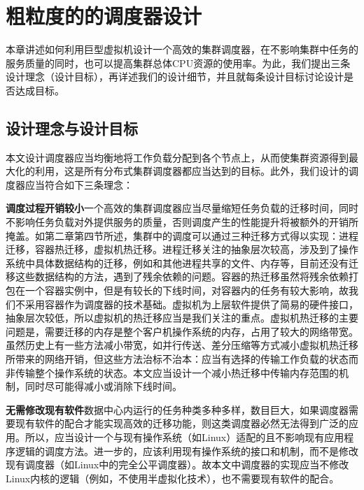 
\chapter{粗粒度的的调度器设计}
\label{chap:LB}
本章讲述如何利用巨型虚拟机设计一个高效的集群调度器，在不影响集群中任务的服务质量的同时，也可以提高集群总体CPU资源的使用率。为此，我们提出三条设计理念（设计目标），再详述我们的设计细节，并且就每条设计目标讨论设计是否达成目标。
\section{设计理念与设计目标}
本文设计调度器应当均衡地将工作负载分配到各个节点上，从而使集群资源得到最大化的利用，这是所有分布式集群调度器都应当达到的目标。此外，我们设计的调度器应当符合如下三条理念：

\noindent\textbf{调度过程开销较小}\quad 一个高效的集群调度器应当尽量缩短任务负载的迁移时间，同时不影响任务负载对外提供服务的质量，否则调度产生的性能提升将被额外的开销所掩盖。如第二章第四节所述，集群中的调度可以通过三种迁移方式得以实现：进程迁移，容器热迁移，虚拟机热迁移。进程迁移关注的抽象层次较高，涉及到了操作系统中具体数据结构的迁移，例如和其他进程共享的文件、内存等，目前还没有迁移这些数据结构的方法，遇到了残余依赖的问题。容器的热迁移虽然将残余依赖打包在一个容器实例中，但是有较长的下线时间，对容器内的任务有较大影响，故我们不采用容器作为调度器的技术基础。虚拟机为上层软件提供了简易的硬件接口，抽象层次较低，所以虚拟机的热迁移应当是我们关注的重点。虚拟机热迁移的主要问题是，需要迁移的内存是整个客户机操作系统的内存，占用了较大的网络带宽。虽然历史上有一些方法减小带宽，如并行传送\cite{parallelm}、差分压缩\cite{compression}等方式减小虚拟机热迁移所带来的网络开销，但这些方法治标不治本：应当有选择的传输工作负载的状态而非传输整个操作系统的状态。本文应当设计一个减小热迁移中传输内存范围的机制，同时尽可能得减小或消除下线时间。

\noindent\textbf{无需修改现有软件}\quad 数据中心内运行的任务种类多种多样，数目巨大，如果调度器需要现有软件的配合才能实现高效的迁移功能，则这类调度器必然无法得到广泛的应用。所以，应当设计一个与现有操作系统（如Linux）适配的且不影响现有应用程序逻辑的调度方法。进一步的，应该利用现有操作系统的接口和机制，而不是修改现有调度器（如Linux中的完全公平调度器）。故本文中调度器的实现应当不修改Linux内核的逻辑（例如，不使用半虚拟化技术），也不需要现有软件的配合。


